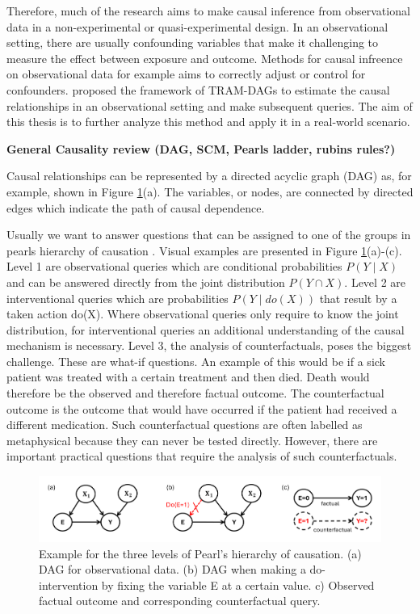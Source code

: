 Therefore, much of the research aims to make causal inference from observational data in a non-experimental or quasi-experimental design. In an observational setting, there are usually confounding variables that make it challenging to measure the effect between exposure and outcome. Methods for causal infreence on observational data for example aims to correctly adjust or control for confounders. \citet{sick2025} proposed the framework of TRAM-DAGs to estimate the causal relationships in an observational setting and make subsequent queries. The aim of this thesis is to further analyze this method and apply it in a real-world scenario.


\textbf{General Causality review (DAG, SCM, Pearls ladder, rubins rules?)}

Causal relationships can be represented by a directed acyclic graph (DAG) as, for example, shown in Figure \ref{fig:pearl_levels}(a). The variables, or nodes, are connected by directed edges which indicate the path of causal dependence.

Usually we want to answer questions that can be assigned to one of the groups in pearls hierarchy of causation \citet{pearl_book2009}. Visual examples are presented in Figure \ref{fig:pearl_levels}(a)-(c). Level 1 are observational queries which are conditional probabilities $P(Y \mid X)$ and can be answered directly from the joint distribution $P(Y \cap X)$. Level 2 are interventional queries which are probabilities $P(Y \mid do(X))$ that result by a taken action do(X). Where observational queries only require to know the joint distribution, for interventional queries an additional understanding of the causal mechanism is necessary. Level 3, the analysis of counterfactuals, poses the biggest challenge. These are what-if questions. An example of this would be if a sick patient was treated with a certain treatment and then died. Death would therefore be the observed and therefore factual outcome. The counterfactual outcome is the outcome that would have occurred if the patient had received a different medication. Such counterfactual questions are often labelled as metaphysical because they can never be tested directly. However, there are important practical questions that require the analysis of such counterfactuals.



\begin{figure}[H]
\centering
\includegraphics[width=1\textwidth]{img/pearl_levels.png}
\caption{Example for the three levels of Pearl's hierarchy of causation. (a) DAG for observational data. (b) DAG when making a do-intervention by fixing the variable E at a certain value. c) Observed factual outcome and corresponding counterfactual query.}
\label{fig:pearl_levels}
\end{figure}


